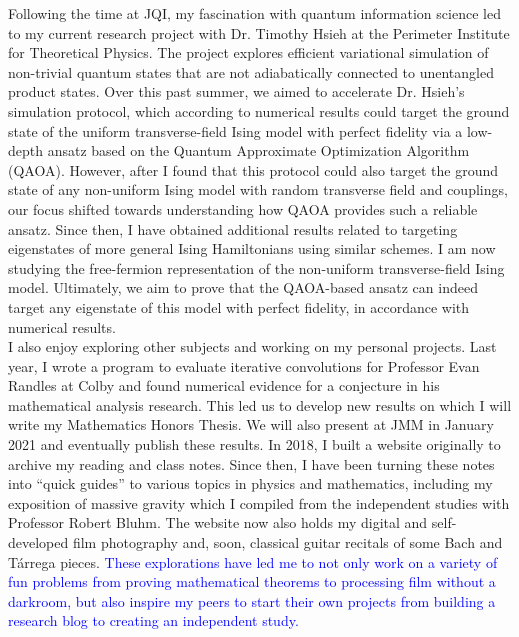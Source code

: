\documentclass[12pt]{article}
\begin{document}
Following the time at JQI, my fascination with quantum information science led to my current research project with Dr. Timothy Hsieh at the Perimeter Institute for Theoretical Physics. The project explores efficient variational simulation of non-trivial quantum states that are not adiabatically connected to unentangled product states. Over this past summer, we aimed to accelerate Dr. Hsieh's simulation protocol, which according to numerical results could target the ground state of the uniform transverse-field Ising model with perfect fidelity via a low-depth ansatz based on the Quantum Approximate Optimization Algorithm (QAOA). However, after I found that this protocol could also target the ground state of any non-uniform Ising model with random transverse field and couplings, our focus shifted towards understanding how QAOA provides such a reliable ansatz. Since then, I have obtained additional results related to targeting eigenstates of more general Ising Hamiltonians using similar schemes. I am now studying the free-fermion representation of the non-uniform transverse-field Ising model. Ultimately, we aim to prove that the QAOA-based ansatz can indeed target any eigenstate of this model with perfect fidelity, in accordance with numerical results.  \\

I also enjoy exploring other subjects and working on my personal projects. Last year, I wrote a program to evaluate iterative convolutions for Professor Evan Randles at Colby and found numerical evidence for a conjecture in his mathematical analysis research. This led us to develop new results on which I will write my Mathematics Honors Thesis. We will also present at JMM in January 2021 and eventually publish these results. In 2018, I built a website originally to archive my reading and class notes. Since then, I have been turning these notes into ``quick guides'' to various topics in physics and mathematics, including my exposition of massive gravity which I compiled from the independent studies with Professor Robert Bluhm. The website now also holds my digital and self-developed film photography and, soon, classical guitar recitals of some Bach and T\'{a}rrega pieces. \textcolor{blue}{These explorations have led me to not only work on a variety of fun problems from proving mathematical theorems to processing film without a darkroom, but also inspire my peers to start their own projects from building a research blog to creating an independent study.}  \\
\end{document}
